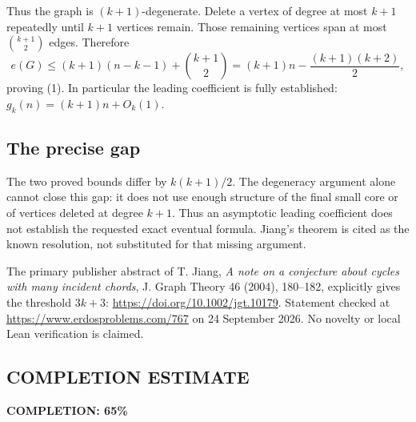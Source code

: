 Thus the graph is \((k+1)\)-degenerate. Delete a vertex of degree at most \(k+1\) repeatedly until \(k+1\) vertices remain. Those remaining vertices span at most \(\binom{k+1}{2}\) edges. Therefore
\[
e(G)\leq(k+1)(n-k-1)+\binom{k+1}{2}
=(k+1)n-\frac{(k+1)(k+2)}2,
\]
proving (1). In particular the leading coefficient is fully established:
\(g_k(n)=(k+1)n+O_k(1)\).

\subsection*{The precise gap}
The two proved bounds differ by \(k(k+1)/2\). The degeneracy argument alone cannot close this gap: it does not use enough structure of the final small core or of vertices deleted at degree \(k+1\). Thus an asymptotic leading coefficient does not establish the requested exact eventual formula. Jiang's theorem is cited as the known resolution, not substituted for that missing argument.

The primary publisher abstract of T. Jiang, \emph{A note on a conjecture about cycles with many incident chords}, J. Graph Theory 46 (2004), 180--182, explicitly gives the threshold \(3k+3\): \url{https://doi.org/10.1002/jgt.10179}. Statement checked at \url{https://www.erdosproblems.com/767} on 24 September 2026. No novelty or local Lean verification is claimed.
\subsection*{COMPLETION ESTIMATE}
\textbf{COMPLETION: 65\%}
